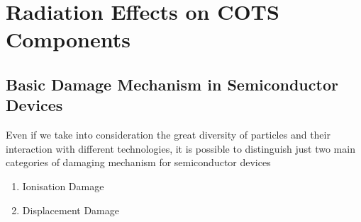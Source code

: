 \documentclass[./dissertation.tex]{subfiles}
\begin{document}
\section{Radiation Effects on COTS Components}
\subsection{Basic Damage Mechanism in Semiconductor Devices}
Even if we take into consideration the great diversity of particles and their interaction with different technologies, it is possible to distinguish just two main categories of damaging mechanism for semiconductor devices
\begin{enumerate}
    \item Ionisation Damage
    \item Displacement Damage
\end{enumerate}
\end{document}
